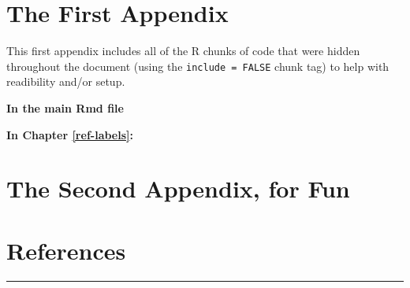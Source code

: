\documentclass[11pt,oneside]{bristolthesis}
\begin{document}
\appendix

\hypertarget{the-first-appendix}{%
\chapter{The First Appendix}\label{the-first-appendix}}

This first appendix includes all of the R chunks of code that were hidden throughout the document (using the \texttt{include\ =\ FALSE} chunk tag) to help with readibility and/or setup.

\textbf{In the main Rmd file}

\textbf{In Chapter \ref{ref-labels}:}

\hypertarget{the-second-appendix-for-fun}{%
\chapter{The Second Appendix, for Fun}\label{the-second-appendix-for-fun}}

\backmatter

\hypertarget{references}{%
\chapter*{References}\label{references}}


\noindent

\setlength{\parindent}{-0.20in}
\setlength{\leftskip}{0.20in}
\setlength{\parskip}{8pt}
\begin{center}\rule{0.5\linewidth}{0.5pt}\end{center}
\end{document}
